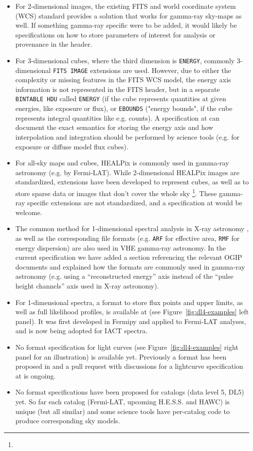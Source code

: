 \begin{itemize}
\item{} For 2-dimensional images, the existing FITS and world coordinate system (WCS) standard provides a solution that works for gamma-ray sky-maps as well. If something gamma-ray specific were to be added, it would likely be specifications on how to store parameters of interest for analysis or provenance in the header.
\item{} For 3-dimensional cubes, where the third dimension is \texttt{ENERGY}, commonly 3-dimensional \texttt{FITS IMAGE} extensions are used. However, due to either the complexity or missing features in the FITS WCS model, the energy axis information is not represented in the FITS header, but in a separate \texttt{BINTABLE HDU} called \texttt{ENERGY} (if the cube represents quantities at given energies, like exposure or flux), or \texttt{EBOUNDS} ("energy bounds", if the cube represents integral quantities like e.g. counts).
A specification at \gadf can document the exact semantics for storing the energy axis and how interpolation and integration should be performed by science tools (e.g. for exposure or diffuse model flux cubes).
\item{} For all-sky maps and cubes, HEALPix\cite{2005ApJ...622..759G} is commonly used in gamma-ray astronomy (e.g. by Fermi-LAT). While 2-dimensional HEALPix images are standardized, extensions have been developed to represent cubes, as well as to store sparse data or images that don't cover the whole sky \footnote{\pointlikedata}. These gamma-ray specific extensions are not standardized, and a specification at \gadf would be welcome.
\item{} The common method for 1-dimensional spectral analysis in X-ray astronomy \citep{Davis:2001}, as well as the corresponding file formats (e.g. \texttt{ARF} for effective area, \texttt{RMF} for energy dispersion) are also used in VHE gamma-ray astronomy. In the current specification we have added a section referencing the relevant OGIP documents and explained how the formats are commonly used in gamma-ray astronomy (e.g. using a ``reconstructed energy'' axis instead of the ``pulse height channels'' axis used in X-ray astronomy).
\item{} For 1-dimensional spectra, a format to store flux points and upper limits, as well as full likelihood profiles, is available at \gadf (see Figure~\ref{fig:dl4-examples} left panel). It was first developed in Fermipy and applied to Fermi-LAT analyses, and is now being adopted for IACT spectra.
\item{} No format specification for light curves (see Figure~\ref{fig:dl4-examples} right panel for an illustration) is available yet. Previously a format has been proposed in \cite{2010AnA...524A..48T} and a pull request with discussions for a lightcurve specification at \gadf is ongoing.
\item{} No format specifications have been proposed for catalogs (data level 5, DL5) yet. So far each catalog (Fermi-LAT, upcoming H.E.S.S. and HAWC) is unique (but all similar) and some science tools have per-catalog code to produce corresponding sky models.
\end{itemize}

